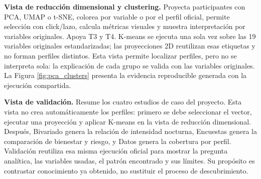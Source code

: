 \documentclass[12pt,a4paper]{article}
\begin{document}
\textbf{Vista de reducci\'on dimensional y clustering.} Proyecta participantes con PCA, UMAP o t-SNE, colorea por variable o por el perfil oficial, permite selecci\'on con click/lazo, calcula m\'etricas visuales y muestra interpretaci\'on por variables originales. Apoya T3 y T4. K-means se ejecuta una sola vez sobre las 19 variables originales estandarizadas; las proyecciones 2D reutilizan esas etiquetas y no forman perfiles distintos. Esta vista permite localizar perfiles, pero no se interpreta sola: la explicaci\'on de cada grupo se valida con las variables originales. La Figura \ref{fig:pca_clusters} presenta la evidencia reproducible generada con la ejecuci\'on compartida.

\textbf{Vista de validaci\'on.} Resume los cuatro estudios de caso del proyecto. Esta vista no crea autom\'aticamente los perfiles: primero se debe seleccionar el vector, ejecutar una proyecci\'on y aplicar K-means en la vista de reducci\'on dimensional. Despu\'es, Bivariado genera la relaci\'on de intensidad nocturna, Encuestas genera la comparaci\'on de bienestar y riesgo, y Datos genera la cobertura por perfil. Validaci\'on reutiliza esa misma ejecuci\'on oficial para mostrar la pregunta anal\'itica, las variables usadas, el patr\'on encontrado y sus l\'imites. Su prop\'osito es contrastar conocimiento ya obtenido, no sustituir el proceso de descubrimiento.
\end{document}
